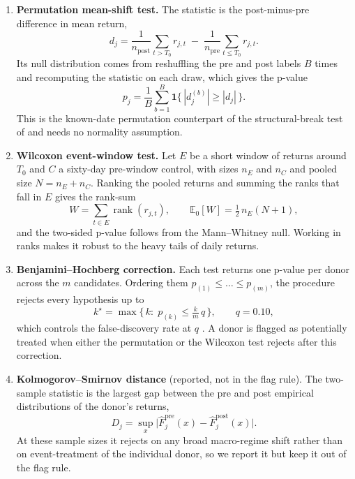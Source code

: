 \begin{enumerate}
\item \textbf{Permutation mean-shift test.} The statistic is the post-minus-pre difference in
mean return,
\begin{equation}
d_j=\frac{1}{n_{\text{post}}}\sum_{t>T_0} r_{j,t}\;-\;\frac{1}{n_{\text{pre}}}\sum_{t\le T_0} r_{j,t}.
\label{eq:permshift}
\end{equation}
Its null distribution comes from reshuffling the pre and post labels $B$ times and recomputing
the statistic on each draw, which gives the p-value
\begin{equation}
p_j=\frac{1}{B}\sum_{b=1}^{B}\mathbf{1}\big\{\,|d_j^{(b)}|\ge|d_j|\,\big\}.
\label{eq:permp}
\end{equation}
This is the known-date permutation counterpart of the structural-break test of
\citet{andrews1993} and needs no normality assumption.

\item \textbf{Wilcoxon event-window test.} Let $E$ be a short window of returns around $T_0$ and
$C$ a sixty-day pre-window control, with sizes $n_E$ and $n_C$ and pooled size $N=n_E+n_C$.
Ranking the pooled returns and summing the ranks that fall in $E$ gives the rank-sum
\begin{equation}
W=\sum_{t\in E}\operatorname{rank}(r_{j,t}),\qquad \mathbb{E}_0[W]=\tfrac{1}{2}\,n_E(N+1),
\label{eq:wilcoxon}
\end{equation}
and the two-sided p-value follows from the Mann--Whitney null. Working in ranks makes it robust
to the heavy tails of daily returns.

\item \textbf{Benjamini--Hochberg correction.} Each test returns one p-value per donor across the
$m$ candidates. Ordering them $p_{(1)}\le\dots\le p_{(m)}$, the procedure rejects every hypothesis
up to
\begin{equation}
k^\star=\max\Big\{\,k:\;p_{(k)}\le\tfrac{k}{m}\,q\,\Big\},\qquad q=0.10,
\label{eq:bh}
\end{equation}
which controls the false-discovery rate at $q$ \citep{benjaminihochberg1995}. A donor is flagged
as potentially treated when either the permutation or the Wilcoxon test rejects after this
correction.

\item \textbf{Kolmogorov--Smirnov distance} (reported, not in the flag rule). The two-sample
statistic is the largest gap between the pre and post empirical distributions of the donor's
returns,
\begin{equation}
D_j=\sup_x\big|\hat F^{\text{pre}}_j(x)-\hat F^{\text{post}}_j(x)\big|.
\label{eq:ks}
\end{equation}
At these sample sizes it rejects on any broad macro-regime shift rather than on event-treatment
of the individual donor, so we report it but keep it out of the flag rule.
\end{enumerate}

